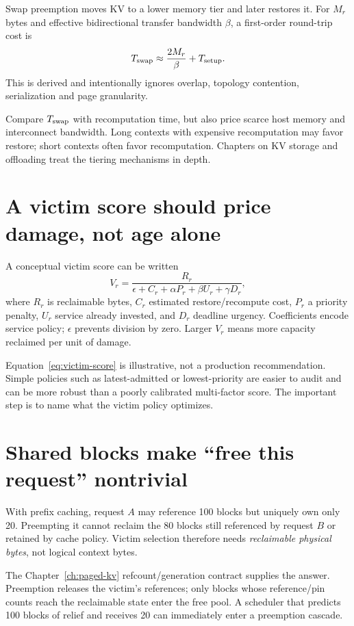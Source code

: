 Swap preemption moves KV to a lower memory tier and later restores it. For $M_r$ bytes
and effective bidirectional transfer bandwidth $\beta$, a first-order round-trip cost
is
\[
T_{\rm swap}\approx\frac{2M_r}{\beta}+T_{\rm setup}.
\]
This is derived and intentionally ignores overlap, topology contention, serialization
and page granularity.

Compare $T_{\rm swap}$ with recomputation time, but also price scarce host memory and
interconnect bandwidth. Long contexts with expensive recomputation may favor restore;
short contexts often favor recomputation. Chapters on KV storage and offloading treat
the tiering mechanisms in depth.

\section{A victim score should price damage, not age alone}

A conceptual victim score can be written
\begin{equation}
V_r =
\frac{R_r}
     {\epsilon+C_r+\alpha P_r+\beta U_r+\gamma D_r},
\label{eq:victim-score}
\end{equation}
where $R_r$ is reclaimable bytes, $C_r$ estimated restore/recompute cost, $P_r$ a
priority penalty, $U_r$ service already invested, and $D_r$ deadline urgency.
Coefficients encode service policy; $\epsilon$ prevents division by zero. Larger
$V_r$ means more capacity reclaimed per unit of damage.

Equation~\ref{eq:victim-score} is illustrative, not a production recommendation.
Simple policies such as latest-admitted or lowest-priority are easier to audit and can
be more robust than a poorly calibrated multi-factor score. The important step is to
name what the victim policy optimizes.

\section{Shared blocks make ``free this request'' nontrivial}

With prefix caching, request $A$ may reference 100 blocks but uniquely own only 20.
Preempting it cannot reclaim the 80 blocks still referenced by request $B$ or retained
by cache policy. Victim selection therefore needs \emph{reclaimable physical bytes},
not logical context bytes.

The Chapter~\ref{ch:paged-kv} refcount/generation contract supplies the answer.
Preemption releases the victim's references; only blocks whose reference/pin counts
reach the reclaimable state enter the free pool. A scheduler that predicts 100 blocks
of relief and receives 20 can immediately enter a preemption cascade.

